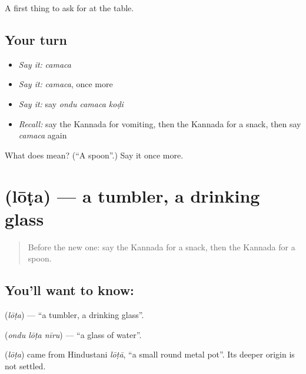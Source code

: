 \begin{grammarlens}[title={What you've built}]
A first thing to ask for at the table.
\end{grammarlens}

\subsection*{Your turn}
\begin{itemize}
\raggedright
  \item \emph{Say it:} \emph{camaca}
  \item \emph{Say it:} \emph{camaca}, once more
  \item \emph{Say it:} say \emph{ondu camaca koḍi}
  \item \emph{Recall:} say the Kannada for vomiting, then the Kannada for a snack, then say \emph{camaca} again
\end{itemize}

\begin{tcolorbox}[breakable,colback=teal!4,colframe=teal!35!black,title={Before you move on}]
What does  mean? (\textquotedblleft{}A spoon\textquotedblright{}.) Say it once more.
\end{tcolorbox}
\section[\texorpdfstring{\kn{ಲೋಟ} (lōṭa)}{ಲೋಟ (lōṭa)}]{ (lōṭa) — a tumbler, a drinking glass}

\label{lesson:KA-C94-glass}



\begin{quote}
Before the new one: say the Kannada for a snack, then the Kannada for a spoon.
\end{quote}

\subsection*{You'll want to know: }
\textbf{} (\emph{lōṭa}) — \textquotedblleft{}a tumbler, a drinking glass\textquotedblright{}.

\textbf{  } (\emph{ondu lōṭa nīru}) — \textquotedblleft{}a glass of water\textquotedblright{}.

\begin{cousinweb}
\textbf{} (\emph{lōṭa}) came from Hindustani \emph{lōṭā}, \textquotedblleft{}a small round metal pot\textquotedblright{}. Its deeper origin is not settled.
\end{cousinweb}

